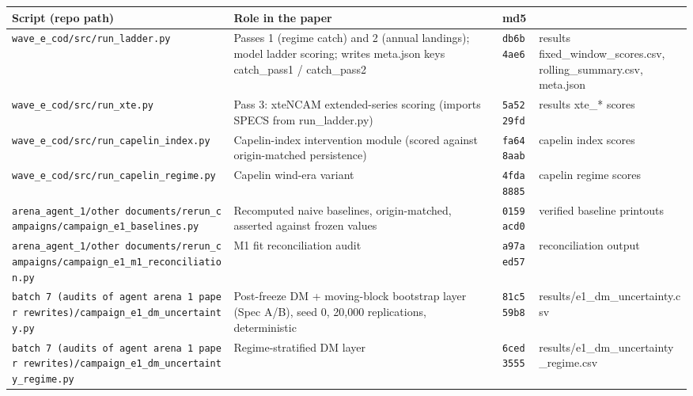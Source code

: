 \documentclass[11pt]{article}
\begin{document}
{\def\LTcaptype{none} %
\begin{longtable}[]{@{}
  >{\raggedright\arraybackslash}p{}
  >{\raggedright\arraybackslash}p{}
  >{\raggedright\arraybackslash}p{}
  >{\raggedright\arraybackslash}p{}@{}}
\toprule\noalign{}
\begin{minipage}[b]{\linewidth}\raggedright
Script (repo path)
\end{minipage} & \begin{minipage}[b]{\linewidth}\raggedright
Role in the paper
\end{minipage} & \begin{minipage}[b]{\linewidth}\raggedright
md5
\end{minipage} & \begin{minipage}[b]{\linewidth}\raggedright
\end{minipage} \\
\midrule\noalign{}
\endhead
\bottomrule\noalign{}
\endlastfoot
\texttt{wave\_e\_cod/src/run\_ladder.py} & Passes 1 (regime catch) and 2
(annual landings); model ladder scoring; writes meta.json keys
catch\_pass1 / catch\_pass2 & \texttt{db6b4ae6} & results
fixed\_window\_scores.csv, rolling\_summary.csv, meta.json \\
\texttt{wave\_e\_cod/src/run\_xte.py} & Pass 3: xteNCAM extended-series
scoring (imports SPECS from run\_ladder.py) & \texttt{5a5229fd} &
results xte\_* scores \\
\texttt{wave\_e\_cod/src/run\_capelin\_index.py} & Capelin-index
intervention module (scored against origin-matched persistence) &
\texttt{fa648aab} & capelin index scores \\
\texttt{wave\_e\_cod/src/run\_capelin\_regime.py} & Capelin wind-era
variant & \texttt{4fda8885} & capelin regime scores \\
\texttt{arena\_agent\_1/other\ documents/rerun\_campaigns/campaign\_e1\_baselines.py}
& Recomputed naive baselines, origin-matched, asserted against frozen
values & \texttt{0159acd0} & verified baseline printouts \\
\texttt{arena\_agent\_1/other\ documents/rerun\_campaigns/campaign\_e1\_m1\_reconciliation.py}
& M1 fit reconciliation audit & \texttt{a97aed57} & reconciliation
output \\
\texttt{batch\ 7\ (audits\ of\ agent\ arena\ 1\ paper\ rewrites)/campaign\_e1\_dm\_uncertainty.py}
& Post-freeze DM + moving-block bootstrap layer (Spec A/B), seed 0,
20,000 replications, deterministic & \texttt{81c559b8} &
results/e1\_dm\_uncertainty.csv \\
\texttt{batch\ 7\ (audits\ of\ agent\ arena\ 1\ paper\ rewrites)/campaign\_e1\_dm\_uncertainty\_regime.py}
& Regime-stratified DM layer & \texttt{6ced3555} &
results/e1\_dm\_uncertainty\_regime.csv \\
\end{longtable}
}
\end{document}
